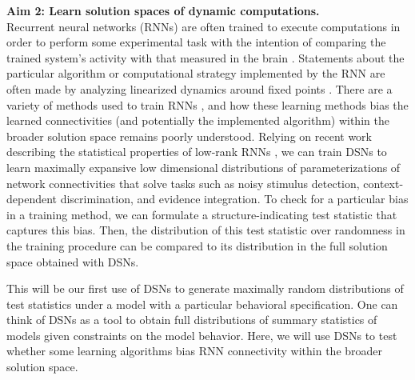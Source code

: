 \documentclass[11pt]{article}
\begin{document}
\textbf{Aim 2: Learn solution spaces of dynamic computations.} \\
Recurrent neural networks (RNNs) are often trained to execute computations in order to perform some experimental task with the intention of comparing the trained system's activity with that measured in the brain \cite{sussillo2014neural}.  Statements about the particular algorithm or computational strategy implemented by the RNN are often made by analyzing linearized dynamics around fixed points \cite{sussillo2013opening}.  There are a variety of methods used to train RNNs \cite{werbos1990backpropagation, sussillo2009generating, martens2011learning, depasquale2018full}, and how these learning methods bias the learned connectivities (and potentially the implemented algorithm) within the broader solution space remains poorly understood.  Relying on recent work describing the statistical properties of low-rank RNNs \cite{mastrogiuseppe2018linking}, we can train DSNs to learn maximally expansive low dimensional distributions of parameterizations of network connectivities that solve tasks such as noisy stimulus detection, context-dependent discrimination, and evidence integration.  To check for a particular bias in a training method, we can formulate a structure-indicating test statistic that captures this bias.  Then, the distribution of this test statistic over randomness in the training procedure can be compared to its distribution in the full solution space obtained with DSNs.

This will be our first use of DSNs to generate maximally random distributions of test statistics under a model with a particular behavioral specification.  One can think of DSNs as a tool to obtain full distributions of summary statistics of models given constraints on the model behavior.  Here, we will use DSNs to test whether some learning algorithms bias RNN connectivity within the broader solution space. 
\end{document}
